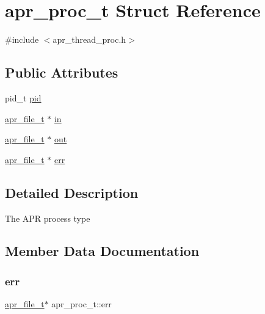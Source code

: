 \hypertarget{structapr__proc__t}{}\section{apr\+\_\+proc\+\_\+t Struct Reference}
\label{structapr__proc__t}


{\ttfamily \#include $<$apr\+\_\+thread\+\_\+proc.\+h$>$}

\subsection*{Public Attributes}
\begin{DoxyCompactItemize}
\item 
pid\+\_\+t \mbox{\hyperlink{structapr__proc__t_a8a8ee4b234156485a72497023e7482e5}{pid}}
\item 
\mbox{\hyperlink{structapr__file__t}{apr\+\_\+file\+\_\+t}} $\ast$ \mbox{\hyperlink{structapr__proc__t_a914bda8939f9d17c9e2f238683fb994b}{in}}
\item 
\mbox{\hyperlink{structapr__file__t}{apr\+\_\+file\+\_\+t}} $\ast$ \mbox{\hyperlink{structapr__proc__t_acb7d7c5226217946d761f0e90ff70d24}{out}}
\item 
\mbox{\hyperlink{structapr__file__t}{apr\+\_\+file\+\_\+t}} $\ast$ \mbox{\hyperlink{structapr__proc__t_ad087f812b5c69ce937db4cf6e8cd5a0b}{err}}
\end{DoxyCompactItemize}


\subsection{Detailed Description}
The A\+PR process type 

\subsection{Member Data Documentation}
\mbox{\label{structapr__proc__t_ad087f812b5c69ce937db4cf6e8cd5a0b}} 
\subsubsection{\texorpdfstring{err}{err}}
{\footnotesize\ttfamily \mbox{\hyperlink{structapr__file__t}{apr\+\_\+file\+\_\+t}}$\ast$ apr\+\_\+proc\+\_\+t\+::err}

